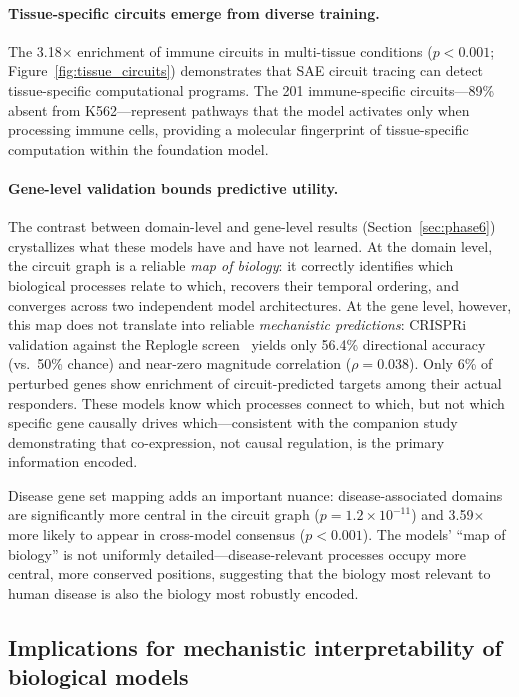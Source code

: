 \documentclass[onecolumn]{article}
\begin{document}
\paragraph{Tissue-specific circuits emerge from diverse training.}
The 3.18$\times$ enrichment of immune circuits in multi-tissue conditions ($p < 0.001$; Figure~\ref{fig:tissue_circuits}) demonstrates that SAE circuit tracing can detect tissue-specific computational programs. The 201 immune-specific circuits---89\% absent from K562---represent pathways that the model activates only when processing immune cells, providing a molecular fingerprint of tissue-specific computation within the foundation model.

\paragraph{Gene-level validation bounds predictive utility.}
The contrast between domain-level and gene-level results (Section~\ref{sec:phase6}) crystallizes what these models have and have not learned. At the domain level, the circuit graph is a reliable \emph{map of biology}: it correctly identifies which biological processes relate to which, recovers their temporal ordering, and converges across two independent model architectures. At the gene level, however, this map does not translate into reliable \emph{mechanistic predictions}: CRISPRi validation against the Replogle screen~\citep{replogle2022mapping} yields only 56.4\% directional accuracy (vs.\ 50\% chance) and near-zero magnitude correlation ($\rho = 0.038$). Only 6\% of perturbed genes show enrichment of circuit-predicted targets among their actual responders. These models know which processes connect to which, but not which specific gene causally drives which---consistent with the companion study~\citep{kendiukhov2025systematic} demonstrating that co-expression, not causal regulation, is the primary information encoded.

Disease gene set mapping adds an important nuance: disease-associated domains are significantly more central in the circuit graph ($p = 1.2 \times 10^{-11}$) and 3.59$\times$ more likely to appear in cross-model consensus ($p < 0.001$). The models' ``map of biology'' is not uniformly detailed---disease-relevant processes occupy more central, more conserved positions, suggesting that the biology most relevant to human disease is also the biology most robustly encoded.


\subsection{Implications for mechanistic interpretability of biological models}
\end{document}
